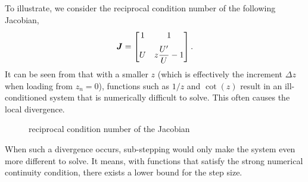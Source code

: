 To illustrate, we consider the reciprocal condition number of the following Jacobian,
\begin{gather}
    \bm{J}=\begin{bmatrix}
        1 & 1                \\[2mm]
        U & z\dfrac{U'}{U}-1
    \end{bmatrix}.
\end{gather}
It can be seen from  that with a smaller $z$ (which is effectively the increment $\Delta{}z$ when loading from $z_n=0$), functions such as $1/z$ and $\cot\left(z\right)$ result in an ill-conditioned system that is numerically difficult to solve.
This often causes the local divergence.
\begin{figure}
    \centering\footnotesize
    \caption{reciprocal condition number of the Jacobian}\label{fig:rcond}
\end{figure}
When such a divergence occurs, sub-stepping would only make the system even more different to solve.
It means, with functions that satisfy the strong numerical continuity condition, there exists a lower bound for the step size.

